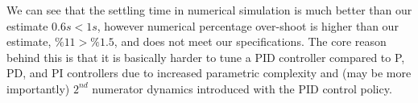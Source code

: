 \documentclass[twoside]{article}
\begin{document}
\vspace{12 pt}

We can see that the settling time in numerical simulation
is much better than our estimate $0.6 s < 1 s$, however
numerical percentage over-shoot is higher than our estimate, 
$\% 11 > \% 1.5$, and does not meet our specifications. 
The core reason behind this is that it is basically harder to
tune a PID controller compared to P, PD, and PI controllers
due to increased parametric complexity and (may be more importantly)
$2^{nd}$ numerator dynamics introduced with the PID control 
policy.




\end{document}
